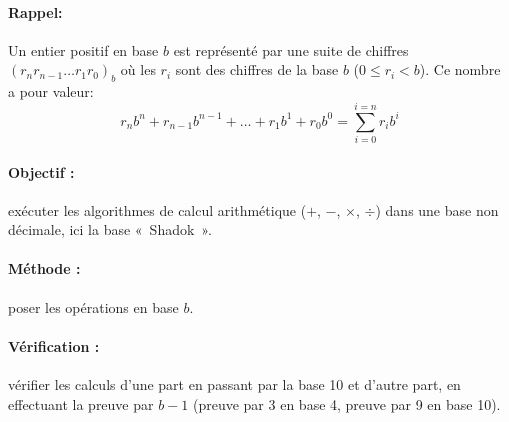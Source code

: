 \paragraph{Rappel:} Un entier positif en base $b$ est représenté par une suite de
	chiffres {$(r_nr_{n-1}\ldots r_1r_0)_b$}
	où les $r_i$ sont des chiffres de la base $b$ ($0\leq r_i < b$).
	Ce nombre a pour valeur:
	$${r_nb^n + r_{n-1}b^{n-1} + \ldots + r_1b^1 + r_0b^0 = 
        \sum^{i=n}_{i = 0} r_ib^i}$$

\paragraph{Objectif :} exécuter les algorithmes de calcul arithmétique ($+$, $-$, $\times$, $\div$)
dans une base non décimale, ici la base «~Shadok~».

\paragraph{Méthode :} poser les opérations en base $b$.

\paragraph{Vérification :} vérifier les calculs d'une part
en passant par la base 10 et d'autre part, en effectuant la preuve par $b-1$ 
(preuve par 3 en base 4, preuve par 9 en base 10).

